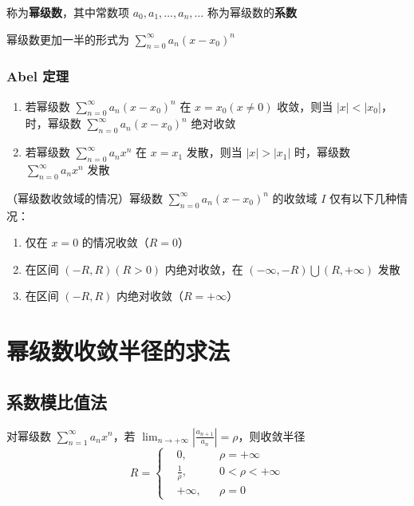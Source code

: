 \documentclass[lang = zh , final , oneside , openany , titlepage , zihao = -4 , linespread = 1.3 , baselineskip = false , cjk-font = windows , text-font = newtx , math-font = newtx , math-style = ISO , uppercase-greek = upright , integral-limits = false]{sjtureport}
\begin{document}
称为\textbf{幂级数}，其中常数项 \(a_0,a_1,\ldots,a_n,\ldots\)
称为幂级数的\textbf{系数}

幂级数更加一半的形式为 \(\displaystyle \sum_{n=0}^\infty a_n(x-x_0)^n\)

\subsubsection{Abel 定理}

\begin{enumerate}
\item
  若幂级数 \(\displaystyle \sum_{n=0}^\infty a_n(x-x_0)^n\) 在
  \(x=x_0(x\neq 0)\) 收敛，则当
  \(\vert x \vert <\vert x_0\vert\)，时，幂级数
  \(\displaystyle \sum_{n=0}^\infty a_n(x-x_0)^n\) 绝对收敛
\item
  若幂级数 \(\displaystyle \sum_{n=0}^\infty a_nx^n\) 在 \(x=x_1\)
  发散，则当 \(\vert x \vert >\vert x_1\vert\) 时，幂级数
  \(\displaystyle \sum_{n=0}^\infty a_nx^n\) 发散
\end{enumerate}

\begin{lemma}
    （幂级数收敛域的情况）幂级数 \(\displaystyle \sum_{n=0}^\infty a_n(x-x_0)^n\) 的收敛域 \(I\)
仅有以下几种情况：

\begin{enumerate}
\def\labelenumi{\arabic{enumi}.}
\item
  仅在 \(x=0\) 的情况收敛（\(R=0\)）
\item
  在区间 \((-R,R)(R>0)\) 内绝对收敛，在
  \((-\infty ,-R)\bigcup(R,+\infty)\) 发散
\item
  在区间 \((-R,R)\) 内绝对收敛（\(R=+\infty\)）
\end{enumerate}
\end{lemma}

\section{幂级数收敛半径的求法}

\subsection{系数模比值法}

\begin{theorem}
    对幂级数 \(\displaystyle \sum_{n=1}^\infty a_nx^n\)，若
\(\displaystyle \lim_{n\to+\infty}\left\vert\frac{a_{n+1}}{a_n}\right\vert = \rho\)，则收敛半径
\[\displaystyle R=\left\{\begin{aligned}&0,&&\rho=+\infty\\  &\frac{1}{\rho}, &&0<\rho<+\infty\\ &+\infty ,&&\rho=0\end{aligned}\right.\]
\end{theorem}
\end{document}

